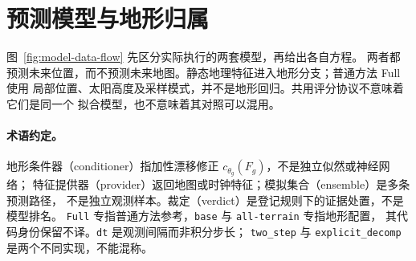 \documentclass[UTF8,11pt]{ctexart}
\begin{document}
\section{预测模型与地形归属}
图~\ref{fig:model-data-flow} 先区分实际执行的两套模型，再给出各自方程。
两者都预测未来位置，而不预测未来地图。静态地理特征进入地形分支；普通方法 Full 使用
局部位置、太阳高度及采样模式，并不是地形回归。共用评分协议不意味着它们是同一个
拟合模型，也不意味着其对照可以混用。
\begin{samepage}
\paragraph{术语约定。}
地形条件器（conditioner）指加性漂移修正 \(c_{\theta_g}(F_g)\)，不是独立似然或神经网络；
特征提供器（provider）返回地图或时钟特征；模拟集合（ensemble）是多条预测路径，
不是独立观测样本。裁定（verdict）是登记规则下的证据处置，不是模型排名。
\texttt{Full} 专指普通方法参考，\texttt{base} 与 \texttt{all-terrain} 专指地形配置，
其代码身份保留不译。\texttt{dt} 是观测间隔而非积分步长；
\texttt{two\_step} 与 \texttt{explicit\_decomp} 是两个不同实现，不能混称。
\par
\end{samepage}
\end{document}

